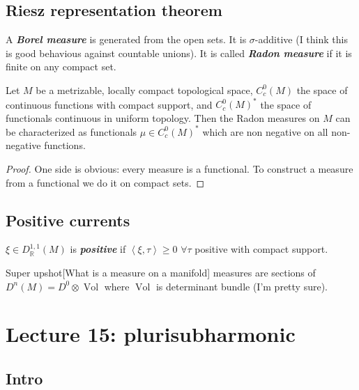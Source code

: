 \subsection{Riesz representation theorem}

\begin{defn}\leavevmode
A \textit{\textbf{Borel measure}} is generated from the open sets. It is \(\sigma\)-additive (I think this is good behavious against countable unions). It is called \textit{\textbf{Radon measure}} if it is finite on any compact set.
\end{defn}

\begin{thm}\leavevmode
Let \(M\) be a metrizable, locally compact topological space, \(C^0_c(M)\) the space of continuous functions with compact support, and \(C^0_c(M)^*\) the space of functionals continuous in uniform topology. Then the Radon measures on \(M\) can be characterized as functionals \(\mu \in C^0_c(M)^*\) which are non negative on all non-negative functions.
\end{thm}

\begin{proof}\leavevmode
 One side is obvious: every measure is a functional. To construct a measure from a functional we do it on compact sets.
\end{proof}

\subsection{Positive currents}

\begin{defn}\leavevmode
\(\xi \in D^{1,1}_\mathbb{R}(M)\) is \textit{\textbf{positive}} if \(\left<\xi,\tau\right> \geq 0\) \(\forall \tau\) positive with compact support.
\end{defn}

\begin{thing7}{Super upshot}[What is a measure on a manifold]\leavevmode
measures are sections of \(D^n(M)=D^0 \otimes \operatorname{Vol}\) where \(\operatorname{Vol}\) is determinant bundle (I'm pretty sure).
\end{thing7}

\section{Lecture 15: plurisubharmonic}

\subsection{Intro}

